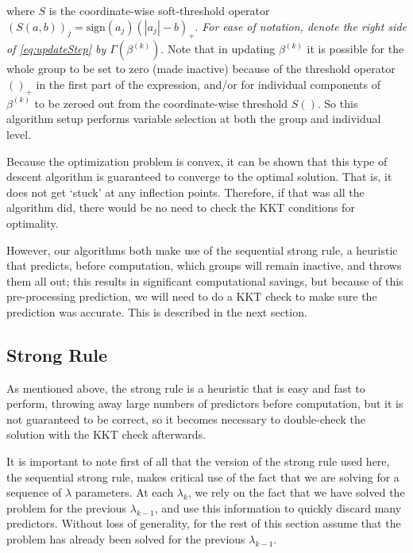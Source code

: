 \documentclass[titlepage]{article}
\begin{document}
where  $S$ is the coordinate-wise soft-threshold operator $(S(a,b))_j = \textrm{sign}(a_j)(|a_j|-b)_+$. \emph{For ease of notation, denote the right side of \autoref{eq:updateStep} by $\Gamma (\beta^{(k)})$}. Note that in updating $\beta^{(k)}$ it is possible for the whole group to be set to zero (made inactive) because of the threshold operator $()_+$ in the first part of the expression, and/or for individual components of $\beta^{(k)}$ to be zeroed out from the coordinate-wise threshold $S()$. So this algorithm setup performs variable selection at both the group and individual level.

Because the optimization problem is convex, it can be shown that this type of descent algorithm is guaranteed to converge to the optimal solution. That is, it does not get `stuck' at any inflection points. Therefore, if that was all the algorithm did, there would be no need to check the KKT conditions for optimality. 

However, our algorithms both make use of the sequential strong rule, a heuristic that predicts, before computation, which groups will remain inactive, and throws them all out; this results in significant computational savings, but because of this pre-processing prediction, we will need to do a KKT check \citep{boyd2004convex} to make sure the prediction was accurate. This is described in the next section.

\subsection{Strong Rule}

As mentioned above, the strong rule \citep{tibshirani2012strong} is a heuristic that is easy and fast to perform, throwing away large numbers of predictors before computation, but it is not guaranteed to be correct, so it becomes necessary to double-check the solution with the KKT check afterwards. 

It is important to note first of all that the version of the strong rule used here, the sequential strong rule, makes critical use of the fact that we are solving for a sequence of $\lambda$ parameters. At each $\lambda_k$, we rely on the fact that we have solved the problem for the previous $\lambda_{k-1}$, and use this information to quickly discard many predictors. Without loss of generality, for the rest of this section assume that the problem has already been solved for the previous $\lambda_{k-1}$.
\end{document}
